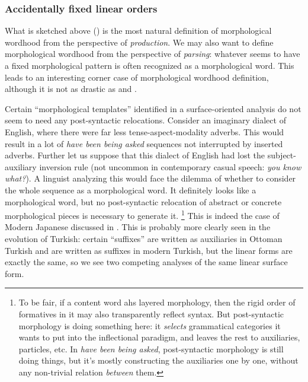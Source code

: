 \documentclass[a4paper, oneside, scheme=plain, 12pt]{article}
\newcommand{\form}[1]{\emph{#1}}
\begin{document}
\subsubsection{Accidentally fixed linear orders}\label{sec:morphological-wordhood-linear}

What is sketched above ()
is the most natural definition of morphological wordhood from the perspective of \emph{production}.
We may also want to define morphological wordhood from the perspective of \emph{parsing}:
whatever seems to have a fixed morphological pattern
is often recognized as a morphological word.
This leads to an interesting corner case of morphological wordhood definition,
although it is not as drastic as  and .

Certain ``morphological templates'' identified in a surface-oriented analysis
do not seem to need any post-syntactic relocations.
Consider an imaginary dialect of English,
where there were far less tense-aspect-modality adverbs.
This would result in a lot of \form{have been being asked} sequences
not interrupted by inserted adverbs.
Further let us suppose that this dialect of English had lost the subject-auxiliary inversion rule
(not uncommon in contemporary casual speech: \form{you know what?}).
A linguist analyzing this would face the dilemma of whether to
consider the whole sequence as a morphological word.
It definitely looks like a morphological word,
but no post-syntactic relocation of abstract or concrete morphological pieces is necessary to generate it.%
\footnote{
    To be fair, if a content word ahs layered morphology,
    then the rigid order of formatives in it may also transparently reflect syntax.
    But post-syntactic morphology is doing something here:
    it \emph{selects} grammatical categories it wants to put into the inflectional paradigm,
    and leaves the rest to auxiliaries, particles, etc.
    In \form{have been being asked}, post-syntactic morphology is still doing things,
    but it's mostly constructing the auxiliaries one by one,
    without any non-trivial relation \emph{between} them.
}
This is indeed the case of Modern Japanese discussed in .
This is probably more clearly seen in the evolution of Turkish:
certain ``suffixes'' are written as auxiliaries in Ottoman Turkish
and are written as suffixes in modern Turkish,
but the linear forms are exactly the same,
so we see two competing analyses of the same linear surface form.
\end{document}

